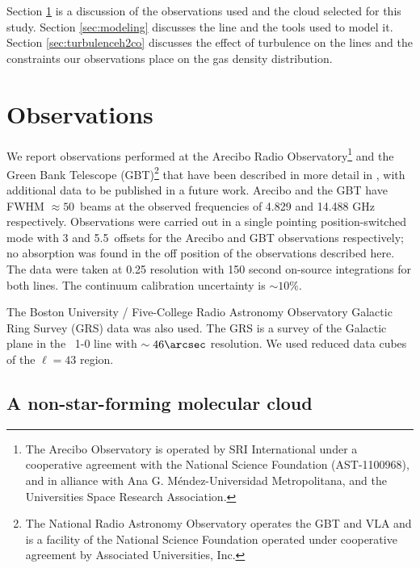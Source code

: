
Section \ref{sec:observations} is a discussion of the observations used and the
cloud selected  for this study.  Section  \ref{sec:modeling} discusses the
\formaldehyde line and the tools used to model it.  Section
\ref{sec:turbulenceh2co} discusses the effect of turbulence on the \formaldehyde
lines and the constraints our observations place on the gas density
distribution.


\section{Observations}
\label{sec:observations}
We report \formaldehyde observations performed at the Arecibo Radio
Observatory\footnote{The Arecibo Observatory is operated by SRI International
under a cooperative agreement with the National Science Foundation
(AST-1100968), and in alliance with Ana G. Méndez-Universidad Metropolitana,
and the Universities Space Research Association.} and the Green
Bank Telescope (GBT)\footnote{ The National Radio Astronomy Observatory operates the
GBT and VLA and is a facility of the National Science Foundation operated under
cooperative agreement by Associated Universities, Inc.  } that have been 
described in more detail in \citet{Ginsburg2011a}, with additional data to be
published in a future work.  Arecibo and
the GBT have FWHM $\approx50$\arcsec\ beams at the observed frequencies of
4.829 and 14.488 GHz respectively.  Observations were carried out in a single
pointing position-switched mode with 3 and 5.5\arcmin\ offsets for the Arecibo
and GBT observations respectively; no absorption was found in the off position
of the observations described here.  The data were taken at 0.25 \kms
resolution with 150 second on-source integrations for both lines.  The continuum
calibration uncertainty is $\sim 10\%$.

The Boston University / Five-College Radio Astronomy Observatory Galactic Ring
Survey (GRS) \thirteenco data was also used.  The GRS \citep{Jackson2006a}
is a survey of the Galactic plane in the \thirteenco\ 1-0 line with $\sim
46\arcsec$ resolution.  We used reduced data cubes of the $\ell=43$ region.

\subsection{\GRSMC A non-star-forming molecular cloud}


